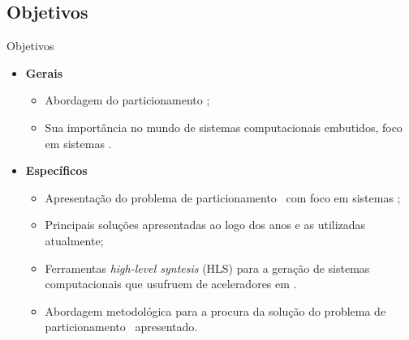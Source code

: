    
   \subsection{Objetivos}
      \begin{frame}{Objetivos}
      
         \begin{itemize} \setlength{\itemsep}{1.2em}
            \item \textbf{Gerais}
            \begin{itemize} \setlength{\itemsep}{0.6em}
               \item Abordagem do particionamento \hs;
               \item Sua importância no mundo de sistemas computacionais embutidos, foco em sistemas \wearables.
            \end{itemize}
            
            \item \textbf{Específicos}
            
            \begin{itemize} \setlength{\itemsep}{0.6em}
               \item Apresentação do problema de particionamento \hs\ com foco em sistemas \wearables;
               
               \item Principais soluções apresentadas ao logo dos anos e as utilizadas atualmente;
               
               \item  Ferramentas \textit{high-level syntesis} (HLS) para a geração de sistemas computacionais que usufruem de aceleradores em \hardware.
               
               \item Abordagem metodológica para a procura da solução do problema de particionamento \hs\ apresentado.
            \end{itemize}
         \end{itemize}
         
      \end{frame}
      

